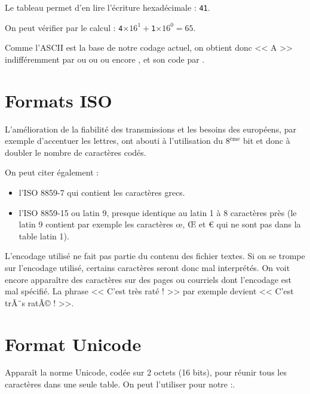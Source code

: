 {Le tableau permet d'en lire l'écriture hexadécimale : \texttt{41}.

On peut vérifier par le calcul : \texttt{4}$\times16^1+$\texttt{1}$\times16^0=65$.

\medskip

Comme l'ASCII est la base de notre codage actuel, on obtient donc << A >> indifféremment par  ou  ou  ou encore , et son code par .

\section{Formats ISO}

L'amélioration de la fiabilité des transmissions et les besoins des européens, par exemple d'accentuer les lettres, ont abouti à l'utilisation du 8$^\text{ème}$ bit et donc à doubler le nombre de caractères codés. 
	

On peut citer également :

\begin{itemize}
	\item l'ISO 8859-7 qui contient les caractères grecs.
    \item l'ISO 8859-15 ou latin 9, presque identique au latin 1 à 8 caractères près (le latin 9 contient par exemple les caractères œ, Œ et € qui ne sont pas dans la table latin 1).
\end{itemize}
	
L'encodage utilisé ne fait pas partie du contenu des fichier textes. Si on se trompe sur l'encodage utilisé, certains caractères seront donc mal interprétés. On voit encore apparaître des caractères sur des pages ou courriels dont l'encodage est mal spécifié. La phrase << C'est très raté ! >> par exemple devient << C'est trÃ¨s ratÃ© ! >>.

\section{Format Unicode}

\date{1990} Apparaît la norme Unicode, codée sur 2 octets (16 bits), pour réunir tous les caractères dans une seule table. On peut l'utiliser pour notre  :.

}
